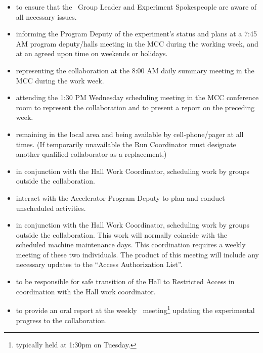 \documentclass[10pt]{article}
\begin{document}
\begin{itemize}

\item to ensure that the \HALL\ Group Leader and Experiment
Spokespeople are  aware of all necessary issues.


\item informing the Program Deputy of the experiment's status and plans at 
a 7:45 AM program deputy/halls meeting in the MCC during the working week, and at an agreed
upon time on weekends or holidays.

\item representing the collaboration at the 8:00 AM daily summary meeting in the MCC
during the work week. 

\item attending the 1:30 PM Wednesday scheduling meeting in the MCC conference 
room to represent the collaboration and to present a report on the
preceding week.

\item remaining in the local area and being available by cell-phone/pager 
at all times.  (If temporarily unavailable the Run Coordinator must designate another 
qualified collaborator as a replacement.)

\item in conjunction with the Hall Work Coordinator, scheduling work by groups
outside the collaboration. 

\item interact with the Accelerator Program Deputy to plan and conduct
unscheduled activities.


\item in conjunction with the Hall Work Coordinator, scheduling
work by groups outside the collaboration. This work will
normally coincide with the scheduled  machine maintenance days.
This coordination requires a weekly meeting of these  two
individuals. The product of this meeting will include any necessary
updates to the ``Access  Authorization List''.

\item to be responsible for safe transition of the Hall to
Restricted Access in coordination with the Hall work
coordinator.

\item to provide an oral report at the weekly \HALL\
meeting\footnote{typically held at 1:30pm on Tuesday.} updating the
experimental progress to the collaboration.


\end{itemize}
\end{document}
